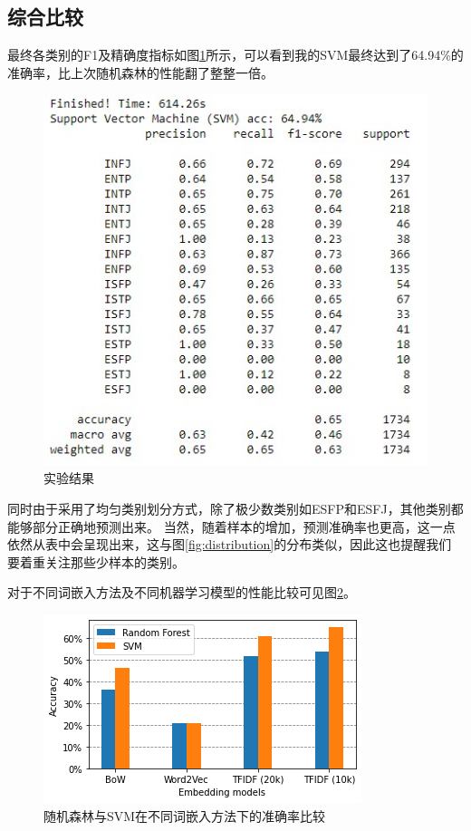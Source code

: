 \documentclass[logo,reportComp]{thesis}
\begin{document}
\subsection{综合比较}
最终各类别的F1及精确度指标如图\ref{fig:f1}所示，可以看到我的SVM最终达到了64.94\%的准确率，比上次随机森林的性能翻了整整一倍。
\begin{figure}[H]
\centering
\includegraphics[width=0.8\linewidth]{fig/tfidf-svm-f1-small.jpg}
\caption{实验结果}
\label{fig:f1}
\end{figure}

同时由于采用了均匀类别划分方式，除了极少数类别如ESFP和ESFJ，其他类别都能够部分正确地预测出来。
当然，随着样本的增加，预测准确率也更高，这一点依然从表中会呈现出来，这与图\ref{fig:distribution}的分布类似，因此这也提醒我们要着重关注那些少样本的类别。

对于不同词嵌入方法及不同机器学习模型的性能比较可见图\ref{fig:comparison}。
\begin{figure}[H]
\centering
\includegraphics[width=0.6\linewidth]{fig/comparison.png}
\caption{随机森林与SVM在不同词嵌入方法下的准确率比较}
\label{fig:comparison}
\end{figure}
\end{document}
